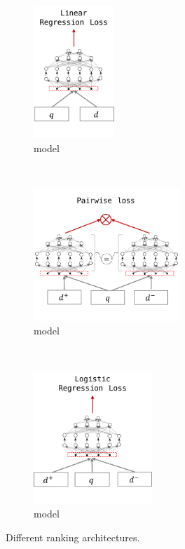 \label{sec:models}
\begin{figure}[t]
    \centering
    \begin{subfigure}[t]{0.26\columnwidth}
        \centering
        \includegraphics[height=5cm]{03-part-02/chapter-04/figs_and_tables/fig_model_1.png}%
        \caption{\label{fig:m1}\mone model}
    \end{subfigure}%
    ~
    \begin{subfigure}[t]{0.40\columnwidth}
        \centering
        \includegraphics[height=5cm]{03-part-02/chapter-04/figs_and_tables/fig_model_2.png}%
        \caption{\label{fig:m2}\mtwo model}
    \end{subfigure}%
    ~
    \begin{subfigure}[t]{0.37\columnwidth}
        \centering
        \includegraphics[height=5cm]{03-part-02/chapter-04/figs_and_tables/fig_model_3.png}%
        \caption{\label{fig:m3}\mthree model}
    \end{subfigure}%
    \caption{\label{fig:ranking-arch} Different ranking architectures.}
\end{figure}
%

